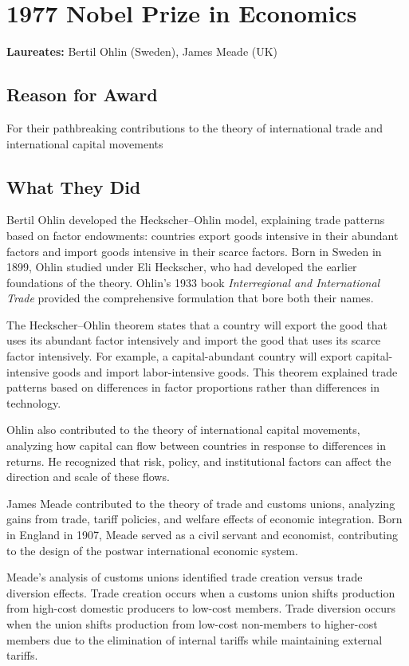\chapter{1977 Nobel Prize in Economics}
\textbf{Laureates: }Bertil Ohlin (Sweden), James Meade (UK)

\section*{Reason for Award}
For their pathbreaking contributions to the theory of international trade and
international capital movements

\section{What They Did}
Bertil Ohlin developed the Heckscher--Ohlin model, explaining trade patterns
based on factor endowments: countries export goods intensive in their abundant
factors and import goods intensive in their scarce factors. Born in Sweden in
1899, Ohlin studied under Eli Heckscher, who had developed the earlier
foundations of the theory. Ohlin's 1933 book \textit{Interregional and International
Trade} provided the comprehensive formulation that bore both their names.

The Heckscher--Ohlin theorem states that a country will export the good that
uses its abundant factor intensively and import the good that uses its scarce
factor intensively. For example, a capital-abundant country will export
capital-intensive goods and import labor-intensive goods. This theorem
explained trade patterns based on differences in factor proportions rather
than differences in technology.

Ohlin also contributed to the theory of international capital movements,
analyzing how capital can flow between countries in response to differences in
returns. He recognized that risk, policy, and institutional factors can affect
the direction and scale of these flows.

James Meade contributed to the theory of trade and customs unions,
analyzing gains from trade, tariff policies, and welfare effects of economic
integration. Born in England in 1907, Meade served as a civil servant and
economist, contributing to the design of the postwar international economic
system.

Meade's analysis of customs unions identified trade creation versus trade
diversion effects. Trade creation occurs when a customs union shifts
production from high-cost domestic producers to low-cost members. Trade
diversion occurs when the union shifts production from low-cost non-members
to higher-cost members due to the elimination of internal tariffs while
maintaining external tariffs.

